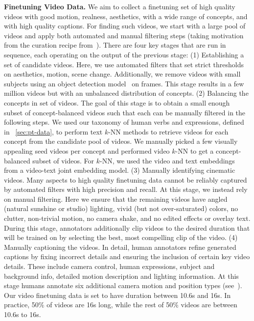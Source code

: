 \noindent \textbf{Finetuning Video Data.}
We aim to collect a finetuning set of high quality videos with good motion, realness, aesthetics, with a wide range of concepts, and with high quality captions.
For finding such videos, we start with a large pool of videos and apply both automated and manual filtering steps (taking motivation from the curation recipe from~\citep{dai2023emu}).
There are four key stages that are run in sequence, each operating on the output of the previous stage:
(1) Establishing a set of candidate videos.
Here, we use automated filters that set strict thresholds on aesthetics, motion, scene change.
Additionally, we remove videos with small subjects using an object detection model~\citep{zhou2022detecting} on frames.
This stage results in a few million videos but with an unbalanced distribution of concepts.
(2) Balancing the concepts in set of videos.
The goal of this stage is to obtain a small enough subset of concept-balanced videos such that each can be manually filtered in the following steps.
We used our taxonomy of human verbs and expressions, defined in ~\cref{sec:pt-data}, to perform text $k$-NN methods
to retrieve videos for each concept from the candidate pool of videos.
We manually picked a few visually appealing seed videos per concept and performed video $k$-NN to get a concept-balanced subset of videos.
For $k$-NN, we used the video and text embeddings from a video-text joint embedding model.
(3) Manually identifying cinematic videos.
Many aspects to high quality finetuning data cannot be reliably captured by automated filters with high precision and recall.
At this stage, we instead rely on manual filtering.
Here we ensure that the remaining videos have angled (natural sunshine or studio) lighting, vivid (but not over-saturated) colors, no clutter, non-trivial motion, no camera shake, and no edited effects or overlay text.
During this stage, annotators additionally clip videos to the desired duration that will be trained on by selecting the best, most compelling clip of the video.
(4) Manually captioning the videos.
In detail, human annotators refine \llamaVideo generated captions by fixing incorrect details and ensuring the inclusion of certain key video details.
These include camera control, human expressions, subject and background info, detailed motion description and lighting information.
At this stage humans annotate six additional camera motion and position types (see~).
Our video finetuning data is set to have duration between 10.6s and 16s.
In practice, 50\% of videos are 16s long, while the rest of 50\% videos are between 10.6s to 16s.

